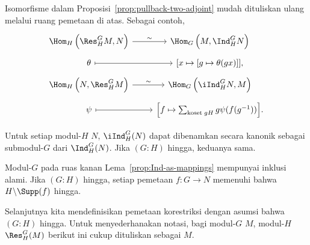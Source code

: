 Isomorfisme dalam Proposisi~\ref{prop:pullback-two-adjoint} mudah dituliskan
ulang melalui ruang pemetaan di atas. Sebagai contoh,
\begin{equation}\label{eqn:Ind-as-mappings}
	\begin{tikzcd}[row sep=tiny]
		\Hom_H\left(\Res^G_H M, N \right) \arrow[r, "\sim"] & \Hom_G\left(M, \Ind^G_H N \right) \\
		\theta \arrow[mapsto, r] & {\left[ x \mapsto [g \mapsto \theta(gx)] \right]}, \\
		\Hom_H\left(N, \Res^G_H M\right) \arrow[r, "\sim"] & \Hom_G\left(\iInd^G_H N, M\right) \\
		\psi \arrow[mapsto, r] & {\left[ f \mapsto \sum_{\text{koset}\; gH} g \psi(f(g^{-1})) \right]}.
	\end{tikzcd}
\end{equation}

\begin{korolari}\label{prop:iInd-Ind}
	Untuk setiap modul-$H$ $N$, $\iInd^G_H(N)$ dapat dibenamkan secara kanonik
	sebagai submodul-$G$ dari $\Ind^G_H(N)$. Jika $(G:H)$ hingga, keduanya sama.
\end{korolari}
\begin{bukti}
	Modul-$G$ pada ruas kanan Lema~\ref{prop:Ind-as-mappings} mempunyai inklusi
	alami. Jika $(G:H)$ hingga, setiap pemetaan $f:G\to N$ memenuhi bahwa
	$H\backslash\Supp(f)$ hingga.
\end{bukti}

Selanjutnya kita mendefinisikan pemetaan korestriksi dengan asumsi bahwa
$(G:H)$ hingga. Untuk menyederhanakan notasi, bagi modul-$G$ $M$, modul-$H$
$\Res^G_H(M)$ berikut ini cukup dituliskan sebagai $M$.

